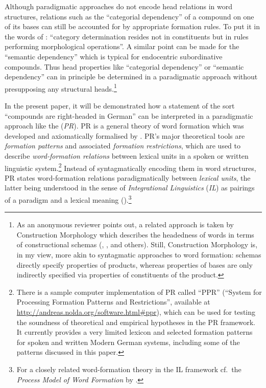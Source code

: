 \documentclass[output=paper
  ,nobabel
  ,draftmode
  ,colorlinks, citecolor=brown
]{langscibook}
\begin{document}
Although paradigmatic approaches do not encode head relations in word
structures, relations such as the ``categorial dependency'' of
a compound on one of its bases can still be accounted for by appropriate
formation rules. To put it in the words of \citet[2]{Zwicky:1985:heads}: ``category determination resides not in
constituents but in rules performing morphological operations''. A similar
point can be made for the ``semantic dependency'' which is
typical for endocentric subordinative compounds. Thus head properties like
``categorial dependency'' or ``semantic
dependency'' can in principle be determined in a paradigmatic approach
without presupposing any structural heads.\footnote{As an anonymous reviewer points
out, a related approach is taken by Construction Morphology which describes the
headedness of words in terms of constructional schemas (\citealt[Section 1.4 and~3.1]{booij:2010:construction:morphology}, \citealt{arcodia:2012:constructions:headedness}, and
others). Still, Construction Morphology is, in my view, more akin to syntagmatic
approaches to word formation: schemas directly specify properties of products,
whereas properties of bases are only indirectly specified via properties of
constituents of the product.}

In the present paper, it will be demonstrated how a statement of the sort
``compounds are right-headed in German'' can be
interpreted in a paradigmatic approach like the \emph{} (\emph{PR}). PR is a
general theory of word formation which was developed and axiomatically
formalised by \citet{nolda:2012:konversion:deutschen,nolda:2018:explaining:linguistic}. PR’s major theoretical tools are
\emph{formation patterns} and associated \emph{formation
restrictions}, which are used to describe \emph{word-formation
relations} between lexical units in a spoken or written linguistic
system.\footnote{There is a sample computer implementation of PR called ``PPR'' (``System for Processing Formation Patterns and
Restrictions'', available at \url{http://andreas.nolda.org/software.html\#ppr}), which can be used for
testing the soundness of theoretical and empirical hypotheses in the PR
framework. It currently provides a very limited lexicon and selected formation
patterns for spoken and written Modern German systems, including some of the
patterns discussed in this paper.} Instead of syntagmatically encoding
them in word structures, PR states word-formation relations paradigmatically
between \emph{lexical units}, the latter being understood in the sense of
\emph{Integrational Linguistics} (\emph{IL}) as pairings of a
paradigm and a lexical meaning (\citealt{lieb:1983:integrational:linguistics:1,lieb:1992:paradigma:klassifikation,lieb:2005:notions:paradigm}).\footnote{For a closely related word-formation theory
in the IL framework cf.\ the \emph{Process Model of Word Formation} by \citet{lieb:2013:general:theory}.}
\end{document}
